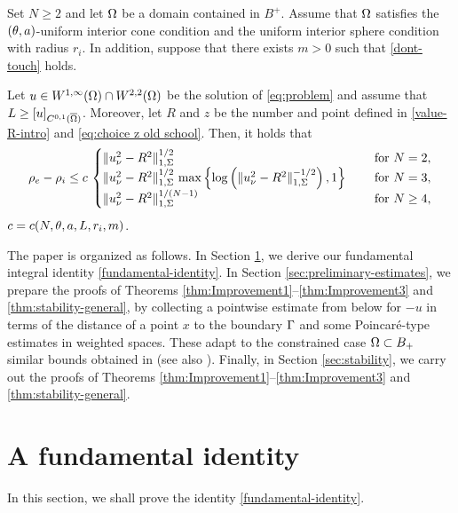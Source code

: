 \documentclass[a4paper,10pt]{amsart}
\numberwithin{equation}{section}
\begin{document}
\begin{thm}
\label{thm:Improvement3}
	Set $N\ge 2$ and let $\Omega$ be a domain contained in $B^+$. Assume that $\Omega$ satisfies the $(\theta,a)$-uniform interior cone condition and the uniform interior sphere condition with radius $r_i$. In addition, suppose that there exists $m>0$ such that \eqref{dont-touch} holds.
\par
Let $u\in W^{1,\infty}(\Omega)\cap W^{2,2} (\Omega)$ be the solution of \eqref{eq:problem} and assume that $L\ge [u]_{C^{0,1}(\overline{\Omega})}$. 
Moreover, let $R$ and $z$ be the number and point defined in \eqref{value-R-intro} and \eqref{eq:choice z old school}. Then, it holds that 
	\begin{equation*}
		\rho_e-\rho_i\le c \,
		\begin{cases}
			\Vert u_\nu^2 - R^2 \Vert_{1,\Sigma}^{ 1/2 } \quad & \text{ for } N=2 ,
			\\
			\Vert u_\nu^2 - R^2 \Vert_{1,\Sigma}^{ 1/2 } \, \max \left\{ \log \left( \Vert u_\nu^2 - R^2 \Vert_{1,\Sigma}^{ -1/2 }  \right) , 1 \right\}  \quad & \text{ for } N=3 ,
			\\
			\Vert u_\nu^2 - R^2 \Vert_{1,\Sigma}^{  1/(N-1) } \quad & \text{ for } N\ge 4 ,
		\end{cases}
	\end{equation*}
$c=c(N, \theta, a , L , r_i , m)$.
\end{thm}
\par
The paper is organized as follows. In Section \ref{sec:fundamental}, we derive our fundamental integral identity \eqref{fundamental-identity}. In Section \ref{sec:preliminary-estimates}, we prepare the proofs of Theorems  \ref{thm:Improvement1}--\ref{thm:Improvement3} and \ref{thm:stability-general},
by collecting a pointwise estimate from below for $-u$ in terms of the distance of a point $x$ to the boundary $\Gamma$ and 
some Poincar\'e-type estimates in weighted spaces. 
These adapt to the constrained case $\Omega\subset B_+$ similar bounds obtained in \cite{MP, MP2, MP3} (see also \cite{DPV}).
Finally, in Section \ref{sec:stability}, we carry out the proofs of Theorems  \ref{thm:Improvement1}--\ref{thm:Improvement3} and \ref{thm:stability-general}.


\section{A fundamental identity}
\label{sec:fundamental}

In this section, we shall prove the identity \eqref{fundamental-identity}. 
\end{document}
